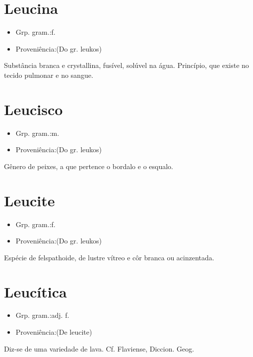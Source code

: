 \section{Leucina}
\begin{itemize}
\item {Grp. gram.:f.}
\end{itemize}
\begin{itemize}
\item {Proveniência:(Do gr. \textunderscore leukos\textunderscore )}
\end{itemize}
Substância branca e crystallina, fusível, solúvel na água.
Princípio, que existe no tecido pulmonar e no sangue.
\section{Leucisco}
\begin{itemize}
\item {Grp. gram.:m.}
\end{itemize}
\begin{itemize}
\item {Proveniência:(Do gr. \textunderscore leukos\textunderscore )}
\end{itemize}
Gênero de peixes, a que pertence o bordalo e o esqualo.
\section{Leucite}
\begin{itemize}
\item {Grp. gram.:f.}
\end{itemize}
\begin{itemize}
\item {Proveniência:(Do gr. \textunderscore leukos\textunderscore )}
\end{itemize}
Espécie de felspathoide, de lustre vítreo e côr branca ou acinzentada.
\section{Leucítica}
\begin{itemize}
\item {Grp. gram.:adj. f.}
\end{itemize}
\begin{itemize}
\item {Proveniência:(De \textunderscore leucite\textunderscore )}
\end{itemize}
Diz-se de uma variedade de lava. Cf. Flaviense, \textunderscore Diccion. Geog.\textunderscore 
